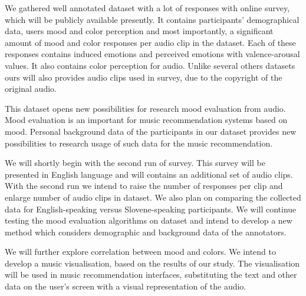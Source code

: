 \documentclass[a4paper]{article}
\begin{document}
We gathered well annotated dataset with a lot of responses with online survey, which will be publicly available prese\-ntly. It contains participants' demographical data, users mood and color perception and most importantly, a significant amount of mood and color responses per audio clip in the dataset. Each of these responses contains induced emotions and perceived emotions with valence-arousal values. It also contains color perception for audio. Unlike several others datasets ours will also provides audio clips used in survey, due to the copyright of the original audio. 

This dataset opens new possibilities for research mood evaluation from audio. Mood evaluation is an important for music recommendation systems based on mood. Personal background data of the participants in our dataset provides new possibilities to research usage of such data for the music recommendation.

We will shortly begin with the second run of survey. This survey will be presented in English language and will contains an additional set of audio clips. With the second run we intend to raise the number of responses per clip and enlarge number of audio clips in dataset. We also plan on comparing the collected data for English-speaking versus Slovene-speaking participants. We will continue testing the mood evaluation algorithms on data\-set and intend to develop a new method which considers demographic and background data of the annotators.

We will further explore correlation between mood and colors. We intend to develop a music visualisation, based on the results of our study. The visualisation will be used in music recommendation interfaces, substituting the text and other data on the user's screen with a visual representation of the audio.



{}
\end{document}
